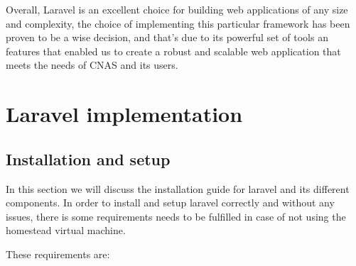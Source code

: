 \medskip Overall, Laravel is an excellent choice for building web applications of any size and complexity, the choice of implementing this particular framework has been proven to be a wise decision, and that's due to its powerful set of tools an features that enabled us to create a robust and scalable web application that meets the needs of CNAS and its users. 
\section{Laravel implementation}
\subsection{Installation and setup}
In this section we will discuss the installation guide for laravel and its different components. In order to install and setup laravel correctly and without any issues, there is some requirements needs to be fulfilled in case of not using the homestead virtual machine. 
\cite{laravel} 

\medskip These requirements are: 


